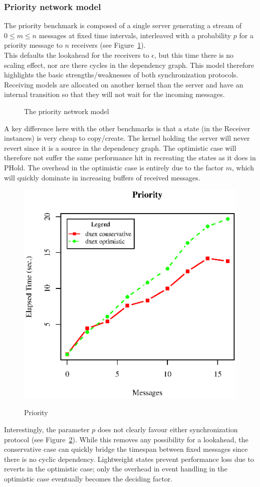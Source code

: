 \subsubsection{Priority network model}
The priority benchmark is composed of a single server generating a stream of $0\leq m \leq n$ messages at fixed time intervals, interleaved with a probability $p$ for a priority message to $n$ receivers (see Figure~\ref{fig:NetworkModel}).\\ This defaults the lookahead for the receivers to $\epsilon$, but this time there is no scaling effect, nor are there cycles in the dependency graph. This model therefore highlights the basic strengths/weaknesses of both synchronization protocols. Receiving models are allocated on another kernel than the server and have an internal transition so that they will not wait for the incoming messages.
\begin{center}
\begin{figure}

\caption{The priority network model}
\label{fig:NetworkModel}
\end{figure}
\end{center}
A key difference here with the other benchmarks is that a state (in the Receiver instances) is very cheap to copy/create. The kernel holding the server will never revert since it is a source in the dependency graph. The optimistic case will therefore not suffer the same performance hit in recreating the states as it does in PHold. The overhead in the optimistic case is entirely due to the factor $m$, which will quickly dominate in increasing buffers of received messages.
\begin{figure}
	\includegraphics[width=.5\textwidth]{fig/fig5.eps}
	\label{fig:Priority}
	\caption{Priority}
\end{figure}
Interestingly, the parameter $p$ does not clearly favour either synchronization protocol (see Figure~\ref{fig:Priority}). While this removes any possibility for a lookahead, the conservative case can quickly bridge the timespan between fixed messages since there is no cyclic dependency. Lightweight states prevent performance loss due to reverts in the optimistic case; only the overhead in event handling in the optimistic case eventually becomes the deciding factor.


